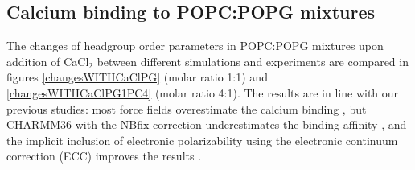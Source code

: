 \documentclass[journal=jpcbfk]{achemso}
\begin{document}
\clearpage
\subsection{Calcium binding to POPC:POPG mixtures}

The changes of headgroup order parameters in POPC:POPG mixtures upon addition of CaCl$_2$ between different simulations
and experiments \cite{borle85,macdonald87} are compared in figures \ref{changesWITHCaClPG} (molar ratio 1:1) and \ref{changesWITHCaClPG1PC4} (molar ratio 4:1).
The results are in line with our previous studies:
most force fields overestimate the calcium binding \cite{catte16,antila19}, but CHARMM36 with the NBfix correction underestimates the binding affinity \cite{antila19}, and the implicit inclusion of electronic polarizability using the electronic continuum correction (ECC) improves the results \cite{melcr18,melcr20}.
\end{document}
